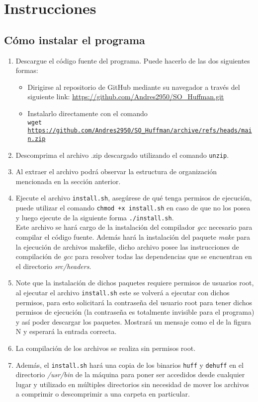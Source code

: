 \documentclass{report}
\begin{document}
\section{Instrucciones}
\subsection{Cómo instalar el programa}
\begin{enumerate}
  \item Descargue el código fuente del programa. Puede hacerlo de las dos siguientes formas:
    \begin{itemize}
      \item Dirigirse al repositorio de GitHub mediante su navegador a través del siguiente link: \url{https://github.com/Andres2950/SO\_Huffman.git}
      \item Instalarlo directamente con el comando \\
    \texttt{wget \url{https://github.com/Andres2950/SO\_Huffman/archive/refs/heads/main.zip}}
    \end{itemize}
  \item Descomprima el archivo .zip descargado utilizando el comando \texttt{unzip}.
\item Al extraer el archivo podrá observar la estructura de organización mencionada en la sección anterior.
\item Ejecute el archivo \texttt{install.sh}, asegúrese de qué tenga permisos de ejecución, puede utilizar el comando \texttt{chmod +x install.sh} en caso de que no los posea y luego ejecute de la siguiente forma \texttt{./install.sh}. \\
  Este archivo se hará cargo de la instalación del compilador \textit{gcc} necesario para compilar el código fuente. Además hará la instalación del paquete \textit{make} para la ejecución de archivos makefile, dicho archivo posee las instrucciones de compilación de \textit{gcc} para resolver todas las dependencias que se encuentran en el directorio \textit{src/headers}.  
\item Note que la instalación de dichos paquetes requiere permisos de usuarios root, al ejecutar el archivo \texttt{install.sh} este se volverá a ejecutar con dichos permisos, para esto solicitará la contraseña del usuario root para tener dichos permisos de ejecución (la contraseña es totalmente invisible para el programa) y así poder descargar los paquetes. Mostrará un mensaje como el de la figura N y esperará la entrada correcta.
\item La compilación de los archivos se realiza sin permisos root.
\item Además, el \texttt{install.sh} hará una copia de los binarios \texttt{huff} y \texttt{dehuff} en el directorio \textit{/usr/bin} de la máquina para poner ser accedidos desde cualquier lugar y utilizado en múltiples directorios sin necesidad de mover los archivos a comprimir o descomprimir a una carpeta en particular.

\end{enumerate}
\end{document}
